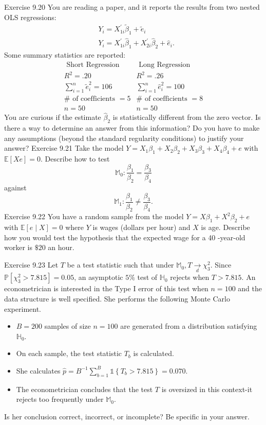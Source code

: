 \documentclass[10pt]{article}
\begin{document}
Exercise 9.20 You are reading a paper, and it reports the results from two nested OLS regressions:
$$
\begin{aligned}
&Y_{i}=X_{1 i}^{\prime} \widetilde{\beta}_{1}+\widetilde{e}_{i} \\
&Y_{i}=X_{1 i}^{\prime} \widehat{\beta}_{1}+X_{2 i}^{\prime} \widehat{\beta}_{2}+\widehat{e}_{i} .
\end{aligned}
$$
Some summary statistics are reported:
$$
\begin{array}{ll}
\text { Short Regression } & \text { Long Regression } \\
R^{2}=.20 & R^{2}=.26 \\
\sum_{i=1}^{n} \widetilde{e}_{i}^{2}=106 & \sum_{i=1}^{n} \widehat{e}_{i}^{2}=100 \\
\# \text { of coefficients }=5 & \# \text { of coefficients }=8 \\
n=50 & n=50
\end{array}
$$
You are curious if the estimate $\widehat{\beta}_{2}$ is statistically different from the zero vector. Is there a way to determine an answer from this information? Do you have to make any assumptions (beyond the standard regularity conditions) to justify your answer? Exercise 9.21 Take the model $Y=X_{1} \beta_{1}+X_{2} \beta_{2}+X_{3} \beta_{3}+X_{4} \beta_{4}+e$ with $\mathbb{E}[X e]=0$. Describe how to test
$$
\mathbb{M}_{0}: \frac{\beta_{1}}{\beta_{2}}=\frac{\beta_{3}}{\beta_{4}}
$$
against
$$
\mathbb{M}_{1}: \frac{\beta_{1}}{\beta_{2}} \neq \frac{\beta_{3}}{\beta_{4}} .
$$
Exercise 9.22 You have a random sample from the model $Y=X \beta_{1}+X^{2} \beta_{2}+e$ with $\mathbb{E}[e \mid X]=0$ where $Y$ is wages (dollars per hour) and $X$ is age. Describe how you would test the hypothesis that the expected wage for a 40 -year-old worker is $\$ 20$ an hour.

Exercise 9.23 Let $T$ be a test statistic such that under $\mathbb{M}_{0}, T \underset{d}{\longrightarrow} \chi_{3}^{2}$. Since $\mathbb{P}\left[\chi_{3}^{2}>7.815\right]=0.05$, an asymptotic $5 \%$ test of $\mathbb{H}_{0}$ rejects when $T>7.815$. An econometrician is interested in the Type I error of this test when $n=100$ and the data structure is well specified. She performs the following Monte Carlo experiment.

\begin{itemize}
  \item $B=200$ samples of size $n=100$ are generated from a distribution satisfying $\mathbb{H}_{0}$.

  \item On each sample, the test statistic $T_{b}$ is calculated.

  \item She calculates $\hat{p}=B^{-1} \sum_{b=1}^{B} \mathbb{1}\left\{T_{b}>7.815\right\}=0.070$.

  \item The econometrician concludes that the test $T$ is oversized in this context-it rejects too frequently under $\mathbb{M}_{0}$.

\end{itemize}
Is her conclusion correct, incorrect, or incomplete? Be specific in your answer.
\end{document}
